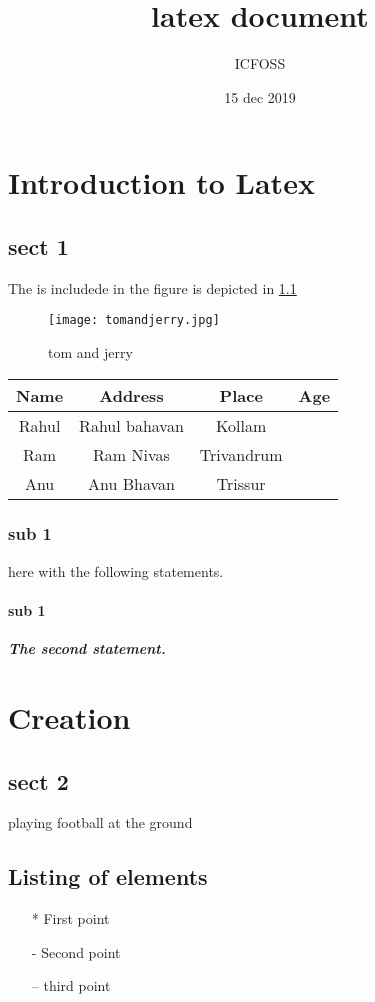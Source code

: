 \documentclass[12pt]{report}
\begin{document}
	
	\title{\textbf{latex document}}
	\author{ICFOSS}
	\date{15 dec 2019 }
	\maketitle
	
	\chapter{Introduction to Latex}
	\section*{sect 1}
	The\textit{} is includede in
		the figure is depicted in \ref{f:smile} 
		
	\begin{figure}[H]
	\centering
	\texttt{[image: tomandjerry.jpg]}
	\caption{tom and jerry}	
	\label{f:smile}
		\end{figure}
	\begin{center}
	\begin{tabular}{|c|c|c|}
		\hline
		Name & Address & Place & Age\\
		\hline
		Rahul & Rahul bahavan & Kollam\\
		\hline
		Ram & Ram Nivas & Trivandrum\\
		\hline
		Anu & Anu Bhavan & Trissur\\
		\hline
	\end{tabular}
   \end{center}


	\subsection{sub 1}
	here with the following statements.
\subsubsection{sub 1}
	\textit{\textbf{The second statement.}}
	
	\chapter{Creation}
	\section*{sect 2}
	playing football at the ground
	\section{Listing of elements}
	\begin{itemize}
		\item[*] First point
		\item[-] Second point
		\item[--]third point
	\end{itemize}
\end{document}
